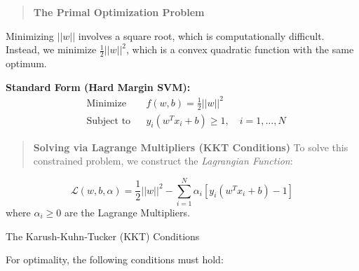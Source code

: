 \documentclass[
  letterpaper,
  DIV=11,
  numbers=noendperiod]{scrreprt}
\begin{document}
\begin{quote}
\textbf{The Primal Optimization Problem}
\end{quote}

Minimizing \(||w||\) involves a square root, which is computationally
difficult. Instead, we minimize \(\frac{1}{2}||w||^2\), which is a
convex quadratic function with the same optimum.

\textbf{Standard Form (Hard Margin SVM):} \[
\begin{aligned}
& \text{Minimize} & & f(w, b) = \frac{1}{2}||w||^2 \\
& \text{Subject to} & & y_i(w^T x_i + b) \ge 1, \quad i = 1, \dots, N
\end{aligned}
\]

\begin{quote}
\textbf{Solving via Lagrange Multipliers (KKT Conditions)} To solve this
constrained problem, we construct the \emph{Lagrangian Function}:
\end{quote}

\[\mathcal{L}(w, b, \alpha) = \frac{1}{2}||w||^2 - \sum_{i=1}^{N} \alpha_i [y_i(w^T x_i + b) - 1]\]
where \(\alpha_i \ge 0\) are the Lagrange Multipliers.

The Karush-Kuhn-Tucker (KKT) Conditions

For optimality, the following conditions must hold:
\end{document}
